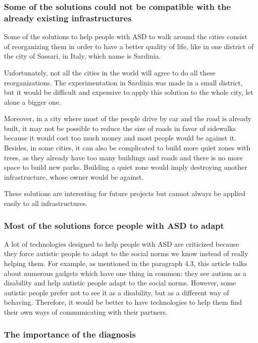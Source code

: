 \subsubsection{Some of the solutions could not be compatible with the already existing infrastructures}

Some of the solutions to help people with ASD to walk around the cities consist of reorganizing them in order to have a better quality of life, like in one district of the city of Sassari, in Italy, which name is Sardinia\cite{2018MobilityPoliciesExtraSmall}.

Unfortunately, not all the cities in the world will agree to do all these reorganizations. The experimentation in Sardinia was made in a small district, but it would be difficult and expensive to apply this solution to the whole city, let alone a bigger one.

Moreover, in a city where most of the people drive by car and the road is already built, it may not be possible to reduce the size of roads in favor of sidewalks because it would cost too much money and most people would be against it. Besides, in some cities, it can also be complicated to build more quiet zones with trees, as they already have too many buildings and roads and there is no more space to build new parks. Building a quiet zone would imply destroying another infrastructure, whose owner would be against.

These solutions are interesting for future projects but cannot always be applied easily to all infrastructures.

\subsubsection{Most of the solutions force people with ASD to adapt}

A lot of technologies designed to help people with ASD are criticized because they force autistic people to adapt to the social norms we know instead of really helping them. For example, as mentioned in the paragraph 4.3, this article talks about numerous gadgets which have one thing in common: they see autism as a disability and help autistic people adapt to the social norms\cite{2017UTravelSmartMobility}. However, some autistic people prefer not to see it as a disability, but as a different way of behaving. Therefore, it would be better to have technologies to help them find their own ways of communicating with their partners.

\subsubsection{The importance of the diagnosis}

